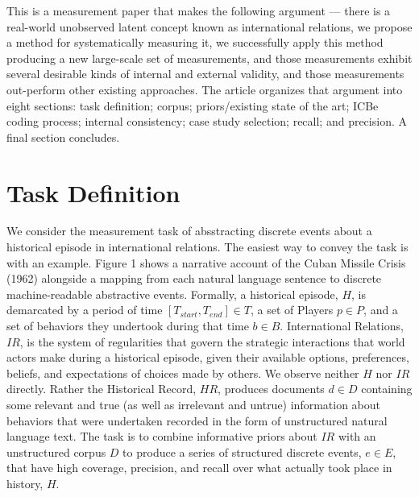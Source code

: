 \documentclass{article}
\begin{document}
This is a measurement paper that makes the following argument --- there
is a real-world unobserved latent concept known as international
relations, we propose a method for systematically measuring it, we
successfully apply this method producing a new large-scale set of
measurements, and those measurements exhibit several desirable kinds of
internal and external validity, and those measurements out-perform other
existing approaches. The article organizes that argument into eight
sections: task definition; corpus; priors/existing state of the art;
ICBe coding process; internal consistency; case study selection; recall;
and precision. A final section concludes.

\hypertarget{task-definition}{%
\section{Task Definition}\label{task-definition}}

We consider the measurement task of absstracting discrete events about a
historical episode in international relations. The easiest way to convey
the task is with an example. Figure 1 shows a narrative account of the
Cuban Missile Crisis (1962) alongside a mapping from each natural
language sentence to discrete machine-readable abstractive events.
Formally, a historical episode, \(H\), is demarcated by a period of time
\([T_{start}, T_{end}] \in T\), a set of Players \(p \in P\), and a set
of behaviors they undertook during that time \(b \in B\). International
Relations, \(IR\), is the system of regularities that govern the
strategic interactions that world actors make during a historical
episode, given their available options, preferences, beliefs, and
expectations of choices made by others. We observe neither \(H\) nor
\(IR\) directly. Rather the Historical Record, \(HR\), produces
documents \(d \in D\) containing some relevant and true (as well as
irrelevant and untrue) information about behaviors that were undertaken
recorded in the form of unstructured natural language text. The task is
to combine informative priors about \(IR\) with an unstructured corpus
\(D\) to produce a series of structured discrete events, \(e \in E\),
that have high coverage, precision, and recall over what actually took
place in history, \(H\).

\clearpage
\end{document}
